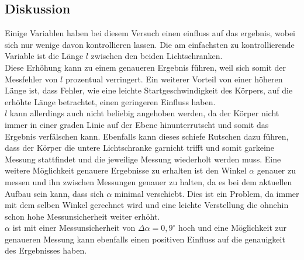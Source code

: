 \subsection{Diskussion}
Einige Variablen haben bei diesem Versuch einen einfluss auf das ergebnis, wobei sich nur wenige davon kontrollieren lassen. Die am einfachsten zu kontrollierende Variable ist die Länge $l$ zwischen den beiden Lichtschranken.
\\
Diese Erhöhung kann zu einem genaueren Ergebnis führen, weil sich somit der Messfehler von $l$ prozentual verringert. Ein weiterer Vorteil von einer höheren Länge ist, dass Fehler, wie eine leichte Startgeschwindigkeit des Körpers, auf die erhöhte Länge betrachtet, einen geringeren Einfluss haben. \\ $l$ kann allerdings auch nicht beliebig angehoben werden, da der Körper nicht immer in einer graden Linie auf der Ebene hinunterrutscht und somit das Ergebnis verfälschen kann. Ebenfalls kann dieses schiefe Rutschen dazu führen, dass der Körper die untere Lichtschranke garnicht trifft und somit garkeine Messung stattfindet und die jeweilige Messung wiederholt werden muss.\bigbreak 
Eine weitere Möglichkeit genauere Ergebnisse zu erhalten ist den Winkel $\alpha$ genauer zu messen und ihn zwischen Messungen genauer zu halten, da es bei dem aktuellen Aufbau sein kann, dass sich $\alpha$ minimal verschiebt. Dies ist ein Problem, da immer mit dem selben Winkel gerechnet wird und eine leichte Verstellung die ohnehin schon hohe Messunsicherheit weiter erhöht. \\ 
$\alpha$ ist mit einer Messunsicherheit von $\Delta \alpha = 0,9^\circ$ hoch und eine Möglichkeit zur genaueren Messung kann ebenfalls einen positiven Einfluss auf die genauigkeit des Ergebnisses haben.
